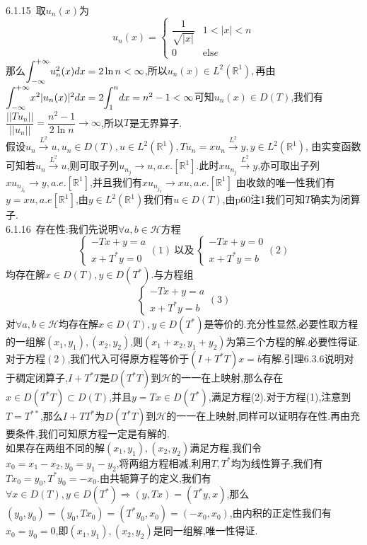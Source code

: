 \documentclass[b5paper]{ctexart}
\begin{document}
6.1.15~取$u_n(x)$为
\[u_n(x)=\left\lbrace \begin{array}{ll}
\dfrac{1}{\sqrt{|x|}} & 1<|x|<n\\
0 & \text{els}e
\end{array}\right. \]
那么$\mathlarger{\int}_{-\infty}^{+\infty}u_n^2(x)dx=2\ln n<\infty$,所以$u_n(x)\in L^2(\mathbb{R}^1),$再由$\mathlarger{\int}_{-\infty}^{+\infty}x^2|u_n(x)|^2dx=2\mathlarger{\int}_{1}^{n}dx=n^2-1<\infty$可知$u_n(x)\in D(T)$,我们有$\dfrac{||Tu_n||}{||u_n||}=\dfrac{n^2-1}{2\ln n}\rightarrow \infty$,所以$T$是无界算子.\\
假设$u_n\xrightarrow{L^2}u,u_n\in D(T),u\in L^2(\mathbb{R}^1),Tu_n=xu_n\xrightarrow{L^2}y,y\in L^2(\mathbb{R}^1)$,
由实变函数可知若$u_n\xrightarrow{L^2}u$,则可取子列$u_{n_j}\to u,a.e.[\mathbb{R}^1]$.此时$xu_{n_j}\xrightarrow{L^2}y$,亦可取出子列$xu_{n_{j_k}}\to y,a.e.[\mathbb{R}^1]$,并且我们有$xu_{n_{j_k}}\to xu,a.e.[\mathbb{R}^1]$
由收敛的唯一性我们有$y=xu,a.e[\mathbb{R}^1]$,由$y\in L^2(\mathbb{R}^1)$我们有$u\in D(T)$,由p60注1我们可知$T$确实为闭算子.\\
6.1.16~存在性:我们先说明$\forall a,b\in \mathscr{H}$方程
\[\left\lbrace \begin{array}{l}
-Tx+y=a\\
x+T^*y=0
\end{array}(1)\right. ~\text{以及}~\left\lbrace \begin{array}{l}
-Tx+y=0\\
x+T^*y=b
\end{array}(2)\right.\]均存在解$x\in D(T),y\in D(T^*)$.与方程组
\[\left\lbrace \begin{array}{l}
-Tx+y=a\\
x+T^*y=b
\end{array}(3)\right.\]
对$\forall a,b\in \mathscr{H}$均存在解$x\in D(T),y\in D(T^*)$是等价的.充分性显然,必要性取方程的一组解$(x_1,y_1),(x_2,y_2)$,则$(x_1+x_2,y_1+y_2)$为第三个方程的解.必要性得证.\\
对于方程$(2)$,我们代入可得原方程等价于$(I+T^*T)x=b$有解.引理$6.3.6$说明对于稠定闭算子,$I+T^*T$是$D(T^*T)$到$\mathscr{H}$的一一在上映射,那么存在$x\in D(T^*T)\subset D(T)$,并且$y=Tx\in D(T^*)$,满足方程(2).对于方程(1),注意到$T=T^{**}$,那么$I+TT^*$为$D(T^*T)$到$\mathscr{H}$的一一在上映射,同样可以证明存在性.再由充要条件,我们可知原方程一定是有解的.\\
如果存在两组不同的解$(x_1,y_1),(x_2,y_2)$满足方程,我们令$x_0=x_1-x_2,y_0=y_1-y_2$,将两组方程相减,利用$T,T^*$均为线性算子,我们有$Tx_0=y_0,T^*y_0=-x_0$.由共轭算子的定义,我们有$\forall x\in D(T),y\in D(T^*)\Rightarrow (y,Tx)=(T^*y,x)$,那么$(y_0,y_0)=(y_0,Tx_0)=(T^*y_0,x_0)=(-x_0,x_0)$,由内积的正定性我们有$x_0=y_0=0$,即$(x_1,y_1),(x_2,y_2)$是同一组解,唯一性得证.\\
\end{document}
